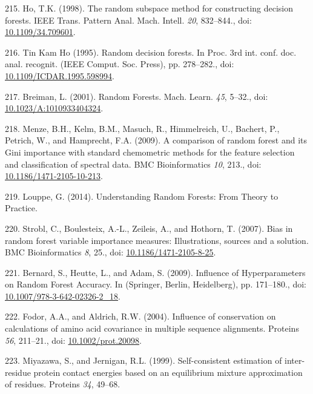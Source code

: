 \documentclass[11pt,a4paper,twoside]{book}
\theoremstyle{definition}
\theoremstyle{definition}
\theoremstyle{remark}
\begin{document}
\hypertarget{ref-Ho1998}{}
215. Ho, T.K. (1998). The random subspace method for constructing
decision forests. IEEE Trans. Pattern Anal. Mach. Intell. \emph{20},
832--844., doi:
\href{https://doi.org/10.1109/34.709601}{10.1109/34.709601}.

\hypertarget{ref-TinKamHo}{}
216. Tin Kam Ho (1995). Random decision forests. In Proc. 3rd int. conf.
doc. anal. recognit. (IEEE Comput. Soc. Press), pp. 278--282., doi:
\href{https://doi.org/10.1109/ICDAR.1995.598994}{10.1109/ICDAR.1995.598994}.

\hypertarget{ref-Breiman2001}{}
217. Breiman, L. (2001). Random Forests. Mach. Learn. \emph{45}, 5--32.,
doi:
\href{https://doi.org/10.1023/A:1010933404324}{10.1023/A:1010933404324}.

\hypertarget{ref-Menze2009}{}
218. Menze, B.H., Kelm, B.M., Masuch, R., Himmelreich, U., Bachert, P.,
Petrich, W., and Hamprecht, F.A. (2009). A comparison of random forest
and its Gini importance with standard chemometric methods for the
feature selection and classification of spectral data. BMC
Bioinformatics \emph{10}, 213., doi:
\href{https://doi.org/10.1186/1471-2105-10-213}{10.1186/1471-2105-10-213}.

\hypertarget{ref-Louppe2014}{}
219. Louppe, G. (2014). Understanding Random Forests: From Theory to
Practice.

\hypertarget{ref-Strobl2007}{}
220. Strobl, C., Boulesteix, A.-L., Zeileis, A., and Hothorn, T. (2007).
Bias in random forest variable importance measures: Illustrations,
sources and a solution. BMC Bioinformatics \emph{8}, 25., doi:
\href{https://doi.org/10.1186/1471-2105-8-25}{10.1186/1471-2105-8-25}.

\hypertarget{ref-Bernard2009}{}
221. Bernard, S., Heutte, L., and Adam, S. (2009). Influence of
Hyperparameters on Random Forest Accuracy. In (Springer, Berlin,
Heidelberg), pp. 171--180., doi:
\href{https://doi.org/10.1007/978-3-642-02326-2_18}{10.1007/978-3-642-02326-2\_18}.

\hypertarget{ref-Fodor2004a}{}
222. Fodor, A.A., and Aldrich, R.W. (2004). Influence of conservation on
calculations of amino acid covariance in multiple sequence alignments.
Proteins \emph{56}, 211--21., doi:
\href{https://doi.org/10.1002/prot.20098}{10.1002/prot.20098}.

\hypertarget{ref-Miyazawa1999a}{}
223. Miyazawa, S., and Jernigan, R.L. (1999). Self-consistent estimation
of inter-residue protein contact energies based on an equilibrium
mixture approximation of residues. Proteins \emph{34}, 49--68.
\end{document}
